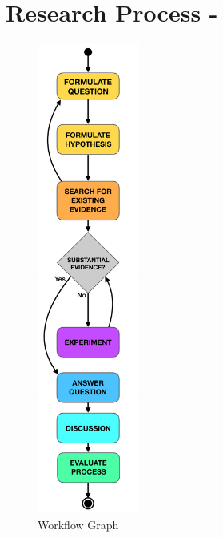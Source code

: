 
\section{Research Process - \checklist}
\label{sec:research process}

\begingroup
\begin{figure}
	\centering
	\includegraphics[height=15.5cm]{figures/workflow_graph_croped.pdf}
	\caption{Workflow Graph}
	\label{fig:workflow_graph}
\end{figure}


\lipsum[1]

\endgroup


